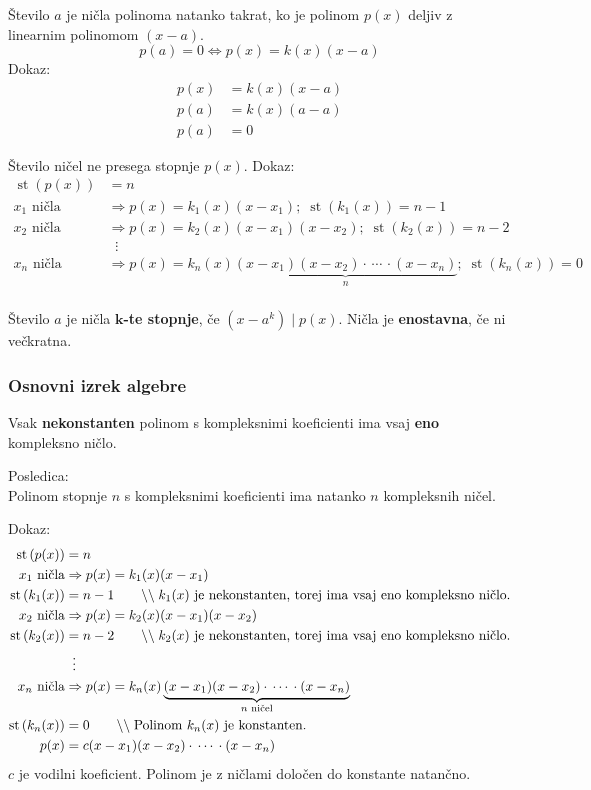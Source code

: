 \documentclass[a4paper,oneside,12pt,fleqn]{article}
\newcommand\krat\cdot
\newcommand{\comment}[1]{\ensuremath{\qquad\backslash\backslash\;}\textnormal{#1}}
\newcommand{\st}{\ensuremath{\operatorname{st}}} %
\renewcommand\implies\Rightarrow
\renewcommand\iff\Leftrightarrow
\numberwithin{equation}{section}
\begin{document}
Število $a$ je ničla polinoma natanko takrat, ko je polinom $p(x)$ deljiv z linearnim
polinomom $(x-a)$.
\[ p(a) = 0 \iff p(x) = k(x)(x-a) \]
Dokaz:
\begin{align*}
  p(x) &= k(x)(x-a) \\
  p(a) &= k(x)(a-a) \\
  p(a) &= 0
\end{align*}

Število ničel ne presega stopnje $p(x)$. Dokaz:
\begin{align*}
  \st\left( p(x) \right) &= n \\
  x_1 \text{ ničla} &\implies p(x) = k_1(x)(x-x_1); \; \st\left( k_1(x) \right) = n-1 \\
  x_2 \text{ ničla} &\implies p(x) = k_2(x)(x-x_1)(x-x_2); \; \st\left( k_2(x) \right) = n-2 \\
  & \;\; \vdots \\
  x_n \text{ ničla} &\implies p(x) =
  k_n(x)\underbrace{(x-x_1)(x-x_2)\krat\,\cdots\,\krat(x-x_n)}_{n}; \; \st\left( k_n(x) \right) = 0 \\
\end{align*}

Število $a$ je ničla \textbf{$\boldsymbol k$-te stopnje}, če $(x-a^k)\;|\;p(x)$. Ničla je
\textbf{enostavna}, če ni večkratna.

\subsubsection{Osnovni izrek algebre}
\label{sec:pol:nic:osnalg}
Vsak \textbf{nekonstanten} polinom s kompleksnimi koeficienti ima vsaj \textbf{eno} kompleksno ničlo.

Posledica:\\
Polinom stopnje $n$ s kompleksnimi koeficienti ima natanko $n$ kompleksnih ničel.

Dokaz:
\begin{align*}
  \st\left( p(x) \right) &= n \\
  x_1 \text{ ničla} &\implies p(x) = k_1(x)(x-x_1) \\
  \st\left( k_1(x) \right) &= n-1 \comment{$k_1(x)$ je nekonstanten, torej ima
  vsaj eno kompleksno ničlo.} \\
  x_2 \text{ ničla} &\implies p(x) = k_2(x)(x-x_1)(x-x_2) \\
  \st\left( k_2(x) \right) &= n-2 \comment{$k_2(x)$ je nekonstanten, torej ima
  vsaj eno kompleksno ničlo.} \\
  & \;\; \vdots \\
  x_n \text{ ničla} &\implies p(x) =
  k_n(x)\underbrace{(x-x_1)(x-x_2)\krat\,\cdots\,\krat(x-x_n)}_{n \text{ ničel}} \\
  \st\left( k_n(x) \right) &= 0 \comment{Polinom $k_n(x)$ je konstanten.} \\
  p(x) &= c(x-x_1)(x-x_2)\krat\,\cdots\,\krat(x-x_n)
\end{align*}
$c$ je vodilni koeficient. Polinom je z ničlami določen do konstante natančno.
\end{document}
